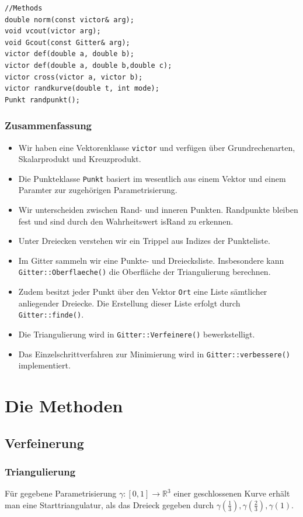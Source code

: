 \documentclass{beamer}
\begin{document}
\begin{frame}[fragile]
\begin{lstlisting}
//Methods
double norm(const victor& arg);
void vcout(victor arg);
void Gcout(const Gitter& arg);
victor def(double a, double b);
victor def(double a, double b,double c);
victor cross(victor a, victor b);
victor randkurve(double t, int mode);
Punkt randpunkt();
\end{lstlisting}
\end{frame}

\begin{frame}
\frametitle{Zusammenfassung}
\begin{itemize}
\item Wir haben eine Vektorenklasse \texttt{victor} und verfügen über Grundrechenarten, Skalarprodukt und Kreuzprodukt. 
\item Die Punkteklasse \texttt{Punkt} basiert im wesentlich aus einem Vektor und einem Paramter zur zugehörigen Parametrisierung.
\item Wir unterscheiden zwischen Rand- und inneren Punkten. Randpunkte bleiben fest und sind durch den Wahrheitswert isRand zu erkennen.
\end{itemize}
\end{frame}

\begin{frame}
\begin{itemize}
\item Unter Dreiecken verstehen wir ein Trippel aus Indizes der Punkteliste. 
\item Im Gitter sammeln wir eine Punkte- und Dreiecksliste. Insbesondere kann \texttt{Gitter::Oberflaeche()} die  Oberfläche der Triangulierung berechnen.
\item Zudem besitzt jeder Punkt über den Vektor \texttt{Ort} eine Liste sämtlicher anliegender Dreiecke. Die Erstellung dieser Liste erfolgt durch \texttt{Gitter::finde()}.
\item Die Triangulierung wird in \texttt{Gitter::Verfeinere()} bewerkstelligt.
\item Das Einzelschrittverfahren zur Minimierung wird in \texttt{Gitter::verbessere()} implementiert.
\end{itemize}
\end{frame}
\section{Die Methoden}
\subsection{Verfeinerung}
\begin{frame}[fragile]
\frametitle{Triangulierung}
Für gegebene Parametrisierung $\gamma: [0,1]\rightarrow \mathbb{R}^3$ einer geschlossenen Kurve erhält man eine Starttriangulatur, als das Dreieck gegeben durch $\gamma(\frac{1}{3}), \gamma(\frac 2 3), \gamma(1)$.
\end{frame}
\end{document}
